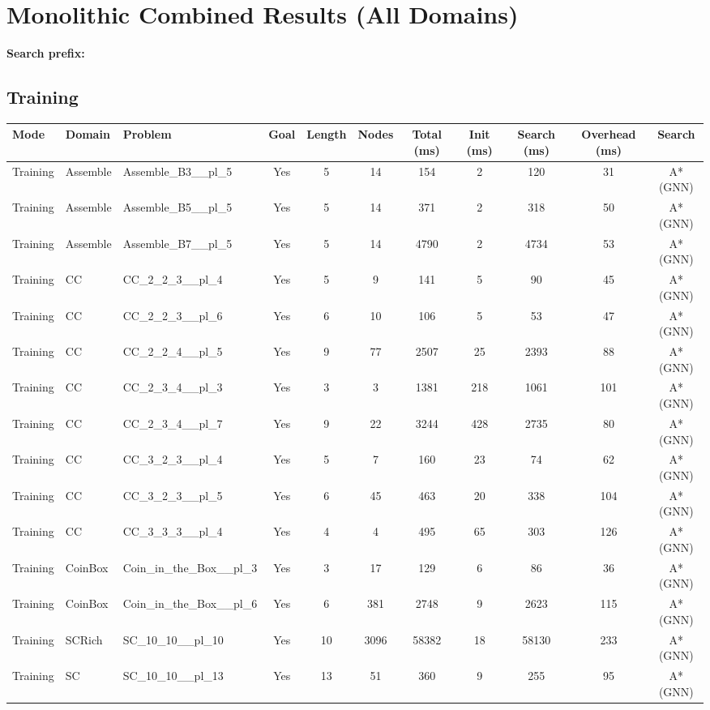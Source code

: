 \documentclass{article}
\begin{document}
\section*{Monolithic Combined Results (All Domains)}
\textbf{Search prefix:} 
\\[0.5cm]
\subsection*{Training}
\begin{tabular}{lllcccccccc}
\toprule
Mode & Domain & Problem & Goal & Length & Nodes & Total (ms) & Init (ms) & Search (ms) & Overhead (ms) & Search \\
\midrule
Training & Assemble & Assemble\_B3\_\_pl\_5 & Yes & 5 & 14 & 154 & 2 & 120 & 31 & A*(GNN) \\
Training & Assemble & Assemble\_B5\_\_pl\_5 & Yes & 5 & 14 & 371 & 2 & 318 & 50 & A*(GNN) \\
Training & Assemble & Assemble\_B7\_\_pl\_5 & Yes & 5 & 14 & 4790 & 2 & 4734 & 53 & A*(GNN) \\
Training & CC & CC\_2\_2\_3\_\_pl\_4 & Yes & 5 & 9 & 141 & 5 & 90 & 45 & A*(GNN) \\
Training & CC & CC\_2\_2\_3\_\_pl\_6 & Yes & 6 & 10 & 106 & 5 & 53 & 47 & A*(GNN) \\
Training & CC & CC\_2\_2\_4\_\_pl\_5 & Yes & 9 & 77 & 2507 & 25 & 2393 & 88 & A*(GNN) \\
Training & CC & CC\_2\_3\_4\_\_pl\_3 & Yes & 3 & 3 & 1381 & 218 & 1061 & 101 & A*(GNN) \\
Training & CC & CC\_2\_3\_4\_\_pl\_7 & Yes & 9 & 22 & 3244 & 428 & 2735 & 80 & A*(GNN) \\
Training & CC & CC\_3\_2\_3\_\_pl\_4 & Yes & 5 & 7 & 160 & 23 & 74 & 62 & A*(GNN) \\
Training & CC & CC\_3\_2\_3\_\_pl\_5 & Yes & 6 & 45 & 463 & 20 & 338 & 104 & A*(GNN) \\
Training & CC & CC\_3\_3\_3\_\_pl\_4 & Yes & 4 & 4 & 495 & 65 & 303 & 126 & A*(GNN) \\
Training & CoinBox & Coin\_in\_the\_Box\_\_pl\_3 & Yes & 3 & 17 & 129 & 6 & 86 & 36 & A*(GNN) \\
Training & CoinBox & Coin\_in\_the\_Box\_\_pl\_6 & Yes & 6 & 381 & 2748 & 9 & 2623 & 115 & A*(GNN) \\
Training & SCRich & SC\_10\_10\_\_pl\_10 & Yes & 10 & 3096 & 58382 & 18 & 58130 & 233 & A*(GNN) \\
Training & SC & SC\_10\_10\_\_pl\_13 & Yes & 13 & 51 & 360 & 9 & 255 & 95 & A*(GNN) \\

\end{tabular}
\end{document}
